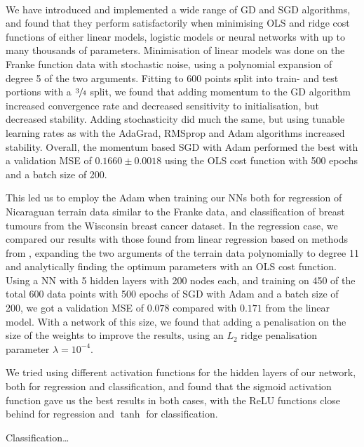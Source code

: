 \\

We have introduced and implemented a wide range of GD and SGD algorithms, and found that they perform satisfactorily when minimising OLS and ridge cost functions of either linear models, logistic models or neural networks with up to many thousands of parameters. Minimisation of linear models was done on the Franke function data with stochastic noise, using a polynomial expansion of degree 5 of the two arguments. Fitting to 600 points split into train- and test portions with a $\sfrac{3}{4}$ split, we found that adding momentum to the GD algorithm increased convergence rate and decreased sensitivity to initialisation, but decreased stability. Adding stochasticity did much the same, but using tunable learning rates as with the AdaGrad, RMSprop and Adam algorithms increased stability. Overall, the momentum based SGD with Adam performed the best with a validation MSE of $0.1660 \pm 0.0018$ using the OLS cost function with 500 epochs and a batch size of 200.

This led us to employ the Adam when training our NNs both for regression of Nicaraguan terrain data similar to the Franke data, and classification of breast tumours from the Wisconsin breast cancer dataset. In the regression case, we compared our results with those found from linear regression based on methods from \cite{Project1}, expanding the two arguments of the terrain data polynomially to degree 11 and analytically finding the optimum parameters with an OLS cost function. Using a NN with 5 hidden layers with 200 nodes each, and training on 450 of the total 600 data points with 500 epochs of SGD with Adam and a batch size of 200, we got a validation MSE of $0.078$ compared with $0.171$ from the linear model. With a network of this size, we found that adding a penalisation on the size of the weights to improve the results, using an $L_2$ ridge penalisation parameter $\lambda = 10^{-4}$.

We tried using different activation functions for the hidden layers of our network, both for regression and classification, and found that the sigmoid activation function gave us the best results in both cases, with the ReLU functions close behind for regression and $\tanh$ for classification.

Classification\ldots